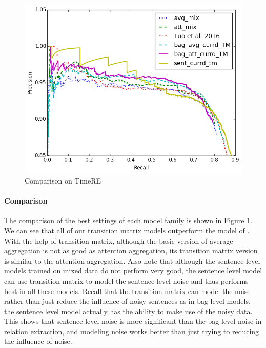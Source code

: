 \begin{figure}[htbp]
\begin{center}
\includegraphics[width=0.9\linewidth]{figures/best_cmp_exp_overall.png}
\caption{Comparison on TimeRE}
\label{fig: cmp_luo}
\end{center}
\end{figure}

\paragraph{Comparison}
The comparison of the best settings of each model family is shown in Figure \ref{fig: cmp_luo}. We can see that all of our transition matrix models outperform the model of \cite{luo2016temporal}. With the help of transition matrix, although the basic version of average aggregation is not as good as attention aggregation, its transition matrix version is similar to the attention aggregation. Also note that although the sentence level models trained on mixed data do not perform very good, the sentence level model can use transition matrix to model the sentence level noise and thus performs best in all these models. Recall that the transition matrix can model the noise rather than just reduce the influence of noisy sentences as in bag level models, the sentence level model actually has the ability to make use of the noisy data. This shows that sentence level noise is more significant than the bag level noise in relation extraction, and modeling noise works better than just trying to reducing the influence of noise.


